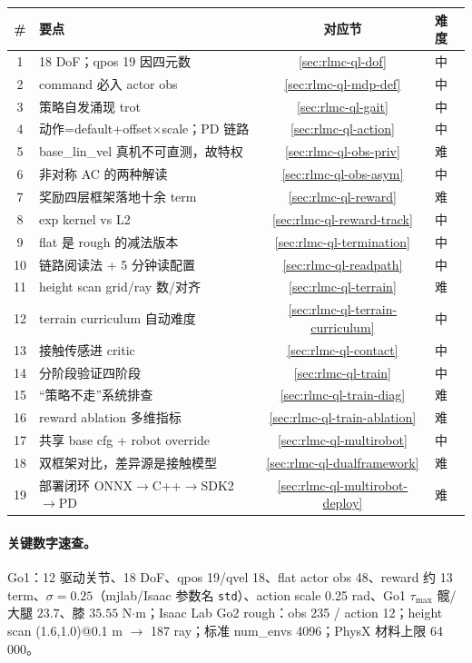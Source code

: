 \begin{center}
\small
\begin{tabular}{@{}clcl@{}}
\toprule
\# & 要点 & 对应节 & 难度 \\
\midrule
1 & 18 DoF；qpos 19 因四元数 & \cref{sec:rlmc-ql-dof} & 中 \\
2 & command 必入 actor obs & \cref{sec:rlmc-ql-mdp-def} & 中 \\
3 & 策略自发涌现 trot & \cref{sec:rlmc-ql-gait} & 中 \\
4 & 动作=default+offset$\times$scale；PD 链路 & \cref{sec:rlmc-ql-action} & 中 \\
5 & base\_lin\_vel 真机不可直测，故特权 & \cref{sec:rlmc-ql-obs-priv} & 难 \\
6 & 非对称 AC 的两种解读 & \cref{sec:rlmc-ql-obs-asym} & 中 \\
7 & 奖励四层框架落地十余 term & \cref{sec:rlmc-ql-reward} & 难 \\
8 & exp kernel vs L2 & \cref{sec:rlmc-ql-reward-track} & 中 \\
9 & flat 是 rough 的减法版本 & \cref{sec:rlmc-ql-termination} & 中 \\
10 & 链路阅读法 + 5 分钟读配置 & \cref{sec:rlmc-ql-readpath} & 中 \\
11 & height scan grid/ray 数/对齐 & \cref{sec:rlmc-ql-terrain} & 难 \\
12 & terrain curriculum 自动难度 & \cref{sec:rlmc-ql-terrain-curriculum} & 中 \\
13 & 接触传感进 critic & \cref{sec:rlmc-ql-contact} & 中 \\
14 & 分阶段验证四阶段 & \cref{sec:rlmc-ql-train} & 中 \\
15 & “策略不走”系统排查 & \cref{sec:rlmc-ql-train-diag} & 难 \\
16 & reward ablation 多维指标 & \cref{sec:rlmc-ql-train-ablation} & 难 \\
17 & 共享 base cfg + robot override & \cref{sec:rlmc-ql-multirobot} & 中 \\
18 & 双框架对比，差异源是接触模型 & \cref{sec:rlmc-ql-dualframework} & 难 \\
19 & 部署闭环 ONNX$\to$C++$\to$SDK2$\to$PD & \cref{sec:rlmc-ql-multirobot-deploy} & 难 \\
\bottomrule
\end{tabular}
\end{center}

\paragraph{关键数字速查。}Go1：12 驱动关节、18 DoF、qpos 19/qvel 18、flat actor obs 48、reward 约 13 term、$\sigma=0.25$（mjlab/Isaac 参数名 \texttt{std}）、action scale 0.25 rad、Go1 $\tau_{\max}$ 髋/大腿 $23.7$、膝 $35.55$ N$\cdot$m；Isaac Lab Go2 rough：obs 235 / action 12；height scan (1.6,1.0)@0.1 m $\to$ 187 ray；标准 num\_envs 4096；PhysX 材料上限 64\,000。

